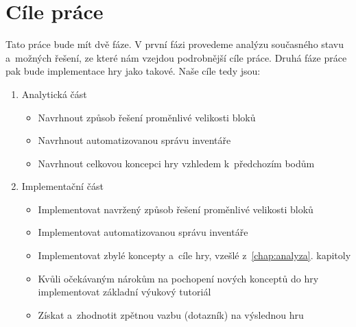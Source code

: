 \section{Cíle práce}
Tato práce bude mít dvě fáze. V první fázi provedeme analýzu současného stavu a~možných řešení, ze které nám vzejdou podrobnější cíle práce. Druhá fáze práce pak bude implementace hry jako takové. Naše cíle tedy jsou:

\begin{enumerate}

 \item Analytická část
\begin{itemize}
	\item Navrhnout způsob řešení proměnlivé velikosti bloků
	\item Navrhnout automatizovanou správu inventáře
	\item Navrhnout celkovou koncepci hry vzhledem k~předchozím bodům
\end{itemize}

 \item Implementační část
\begin{itemize}
	\item Implementovat navržený způsob řešení proměnlivé velikosti bloků
	\item Implementovat automatizovanou správu inventáře
	\item Implementovat zbylé koncepty a~cíle hry, vzešlé z~\ref{chap:analyza}. kapitoly
	\item Kvůli očekávaným nárokům na pochopení nových konceptů do hry implementovat základní výukový tutoriál
	\item Získat a~zhodnotit zpětnou vazbu (dotazník) na výslednou hru
\end{itemize}

\end{enumerate}


